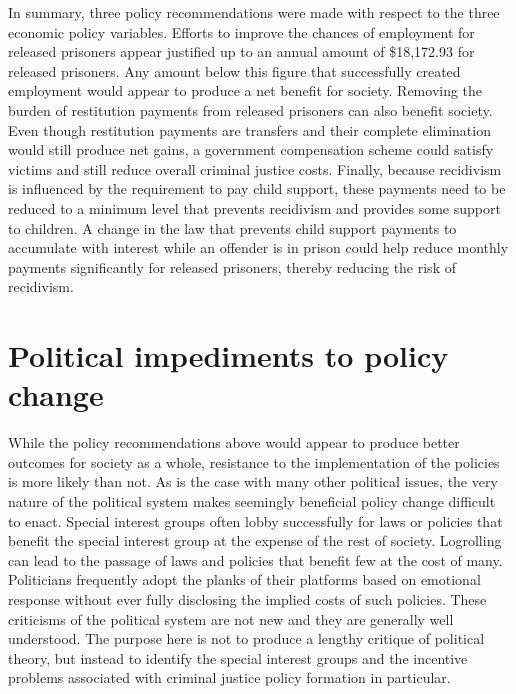 In summary, three policy recommendations were made with respect to the three economic policy variables.  Efforts to improve the chances of employment for released prisoners appear justified up to an annual amount of \$18,172.93 for released prisoners.  Any amount below this figure that successfully created employment would appear to produce a net benefit for society.  Removing the burden of restitution payments from released prisoners can also benefit society.  Even though restitution payments are transfers and their complete elimination would still produce net gains, a government compensation scheme could satisfy victims and still reduce overall criminal justice costs.  Finally, because recidivism is influenced by the requirement to pay child support, these payments need to be reduced to a minimum level that prevents recidivism and provides some support to children.  A change in the law that prevents child support payments to accumulate with interest while an offender is in prison could help reduce monthly payments significantly for released prisoners, thereby reducing the risk of recidivism.

\section{Political impediments to policy change}

While the policy recommendations above would appear to produce better outcomes for society as a whole, resistance to the implementation of the policies is more likely than not.  As is the case with many other political issues, the very nature of the political system makes seemingly beneficial policy change difficult to enact.  Special interest groups often lobby successfully for laws or policies that benefit the special interest group at the expense of the rest of society.  Logrolling can lead to the passage of laws and policies that benefit few at the cost of many.  Politicians frequently adopt the planks of their platforms based on emotional response without ever fully disclosing the implied costs of such policies.  These criticisms of the political system are not new and they are generally well understood.  The purpose here is not to produce a lengthy critique of political theory, but instead to identify the special interest groups and the incentive problems associated with criminal justice policy formation in particular.

